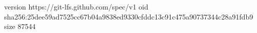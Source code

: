 version https://git-lfs.github.com/spec/v1
oid sha256:25dee59ad7525cc67b04a9838ed9330cfddc13c91c475a90737344c28a91fdb9
size 87544
